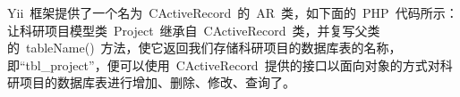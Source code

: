 Yii~框架提供了一个名为~CActiveRecord~的~AR~类，如下面的~PHP~代码所示：让科研项目模型类~Project~继承自~CActiveRecord~类，并复写父类的~tableName()~方法，使它返回我们存储科研项目的数据库表的名称，即“tbl\_project”，便可以使用~CActiveRecord~提供的接口以面向对象的方式对科研项目的数据库表进行增加、删除、修改、查询了。

\noindent
\ttfamily
\hlstd{}\hspace*{\fill}\\
\hlopt{\{}\hspace*{\fill}\\
\hlstd{}\hlstd{\ \ \ \ }\hlstd{}\hlstd{}\hlstd{}\hlopt{()}\hspace*{\fill}\\
\hlstd{}\hlstd{\ \ \ \ }\hlstd{}\hlopt{\{}\hspace*{\fill}\\
\hlstd{}\hlstd{\ \ \ \ \ \ \ \ }\hlstd{}\hlstd{}\hlstd{}\hlopt{;}\hspace*{\fill}\\
\hlstd{}\hlstd{\ \ \ \ }\hlstd{}\hlopt{\}}\hspace*{\fill}\\
\hspace*{\fill}\\
\mbox{}
\normalfont
\normalsize
%
%
%
%
%
%
%
%

